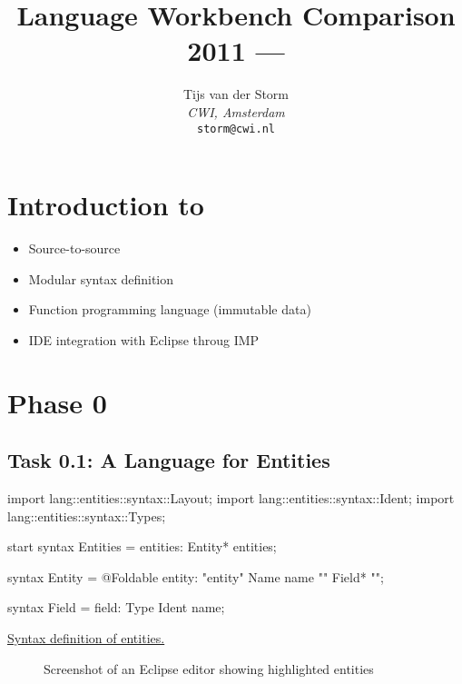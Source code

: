 \documentclass[a4paper]{article}
\def\source#1#2{\href{http://svn.rascal-mpl.org/lwc/trunk/lwc11/src/#1}{#2}}
\begin{document}
\title{Language Workbench Comparison 2011 --- \Rascal}
\author{Tijs van der Storm\\
\textsl{CWI, Amsterdam}\\
\texttt{storm@cwi.nl}}
\maketitle

\section*{Introduction to \Rascal}

\begin{itemize}
\item Source-to-source
\item Modular syntax definition
\item Function programming language (immutable data)
\item IDE integration with Eclipse throug IMP
\end{itemize}

\section*{Phase 0}

\subsection*{Task 0.1: A Language for Entities}

\begin{listing}
\begin{rascal}
import lang::entities::syntax::Layout;
import lang::entities::syntax::Ident;
import lang::entities::syntax::Types;

start syntax Entities
    = entities: Entity* entities;

syntax Entity 
    = @Foldable entity: "entity" Name name "{" Field* "}";

syntax Field 
    = field: Type Ident name;
\end{rascal}
\caption{\source{lang/entities/syntax}{Syntax definition of
  entities.}}
\end{listing}

\begin{figure}
\begin{center}
\end{center}
\caption{Screenshot of an Eclipse editor showing highlighted entities\label{FIG:entities}}
\end{figure}
\end{document}
